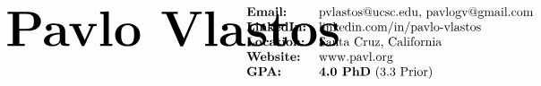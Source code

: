 \documentclass[paper=a4,fontsize=11pt]{article} %
\def \mainColWidth {0.8\textwidth}		%
\begin{document}
	\setlength{\abovedisplayskip}{0pt}
	\setlength{\belowdisplayskip}{0pt}
	\setlength{\abovedisplayshortskip}{0pt}
	\setlength{\belowdisplayshortskip}{0pt}
\begin{align*}
	&
	\begin{array}{ll}
	\parbox[t]{0.55\textwidth}{%
		\text{\fontsize{40}{48}\selectfont \ \textbf{Pavlo Vlastos}}\\
	}%
	&
	\parbox{\mainColWidth}{%
		$\begin{array}[t]{ll}
		\textbf{Email:} & \text{pvlastos@ucsc.edu, pavlogv@gmail.com}\\
		\textbf{LinkedIn:} & \text{linkedin.com/in/pavlo-vlastos}\\
		\textbf{Location:} & \text{Santa Cruz, California}\\
		\textbf{Website:} & \text{www.pavl.org}\\
		\textbf{GPA:} & \textbf{4.0 PhD} \ \text{(3.3 Prior)}
		\end{array}$
	}%
	\end{array}
\end{align*}
\end{document}
